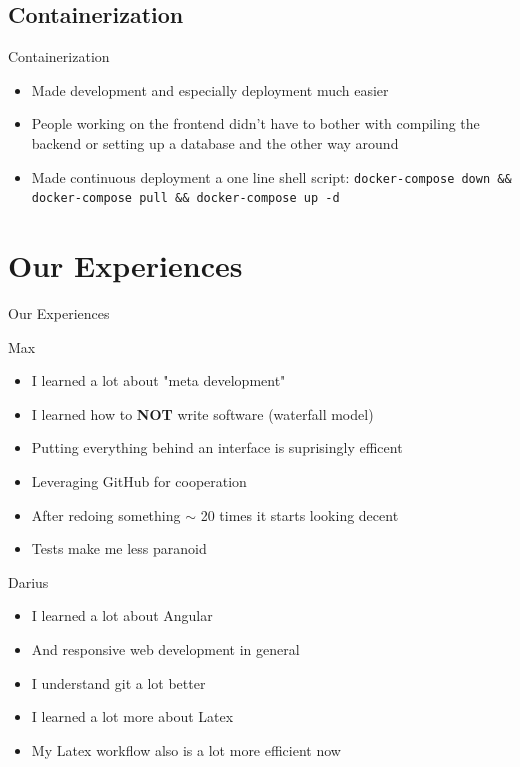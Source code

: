 \documentclass{beamer}
\begin{document}
\subsection{Containerization}
\begin{frame}{Containerization}
  \begin{itemize}
    \item Made development and especially deployment much easier
    \item People working on the frontend didn't have to bother with compiling the backend or setting up a database and the other way around
    \item Made continuous deployment a one line shell script: \texttt{docker-compose down \&\& docker-compose pull \&\& docker-compose up -d}
  \end{itemize}
\end{frame}

\section{Our Experiences}

\begin{frame}
  \begin{center}
    \Huge{Our Experiences}
  \end{center}
\end{frame}

\begin{frame}{Max}
  \begin{itemize}
    \item I learned a lot about "meta development"
    \item I learned how to \textbf{NOT} write software (waterfall model)
    \item Putting everything behind an interface is suprisingly efficent
    \item Leveraging GitHub for cooperation
    \item After redoing something $\sim$ 20 times it starts looking decent
    \item Tests make me less paranoid
  \end{itemize}
\end{frame}

\begin{frame}{Darius}
  \begin{itemize}
    \item I learned a lot about Angular
    \item And responsive web development in general
    \item I understand git a lot better
    \item I learned a lot more about Latex
    \item My Latex workflow also is a lot more efficient now
  \end{itemize}
\end{frame}
\end{document}
